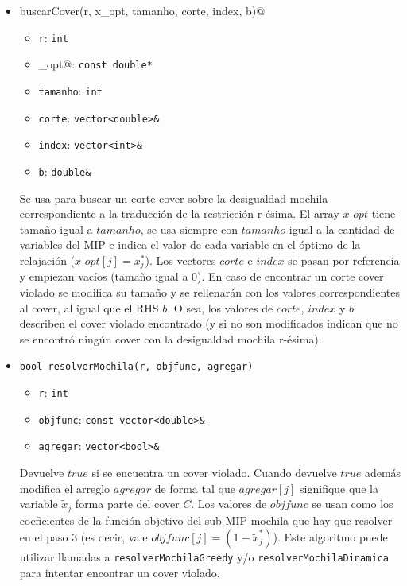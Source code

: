 \begin{itemize}
\item \verb@void buscarCover(r, x_opt, tamanho, corte, index, b)@
	\begin{itemize}
	\item \verb_r_: \verb_int_
	\item \verb@x_opt@: \verb_const double*_
	\item \verb_tamanho_: \verb_int_
	\item \verb_corte_: \verb_vector<double>&_
	\item \verb_index_: \verb_vector<int>&_
	\item \verb_b_: \verb_double&_
	\end{itemize}
Se usa para buscar un corte cover sobre la desigualdad mochila correspondiente a la traducción de la restricción r-ésima. El array $x\_opt$ tiene tamaño igual a $tamanho$, se usa siempre con $tamanho$ igual a la cantidad de variables del MIP e indica el valor de cada variable en el óptimo de la relajación ($x\_opt[j]=x^*_j$). Los vectores $corte$ e $index$ se pasan por referencia y empiezan vacíos (tamaño igual a 0). En caso de encontrar un corte cover violado se modifica su tamaño y se rellenarán con los valores correspondientes al cover, al igual que el RHS $b$. O sea, los valores de $corte$, $index$ y $b$ describen el cover violado encontrado (y si no son modificados indican que no se encontró ningún cover con la desigualdad mochila r-ésima).

\item \verb_bool resolverMochila(r, objfunc, agregar)_
	\begin{itemize}
	\item \verb_r_: \verb_int_
	\item \verb_objfunc_: \verb_const vector<double>&_
	\item \verb_agregar_: \verb_vector<bool>&_
	\end{itemize}
Devuelve $true$ si se encuentra un cover violado. Cuando devuelve $true$ además modifica el arreglo $agregar$ de forma tal que $agregar[j]$ signifique que la variable $\tilde{x}_j$ forma parte del cover $C$. Los valores de $objfunc$ se usan como los coeficientes de la función objetivo del sub-MIP mochila que hay que resolver en el paso 3 (es decir, vale $objfunc[j]=(1-\tilde{x}^*_j)$). Este algoritmo puede utilizar llamadas a \verb_resolverMochilaGreedy_ y/o \verb_resolverMochilaDinamica_ para intentar encontrar un cover violado.


\end{itemize}
